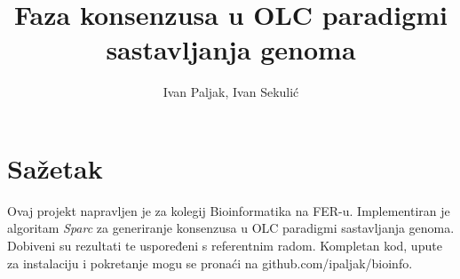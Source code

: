 \documentclass[times, utf8, seminar]{fer}
\begin{document}
\title{Faza konsenzusa u OLC paradigmi sastavljanja genoma}

\author{Ivan Paljak, Ivan Sekulić}


\maketitle

\tableofcontents















\chapter{Sažetak}
Ovaj projekt napravljen je za kolegij Bioinformatika na FER-u.
Implementiran je algoritam \emph{Sparc} za generiranje konsenzusa u OLC paradigmi sastavljanja genoma.
Dobiveni su rezultati te uspoređeni s referentnim radom.
Kompletan kod, upute za instalaciju i pokretanje mogu se pronaći na github.com/ipaljak/bioinfo.
\end{document}
